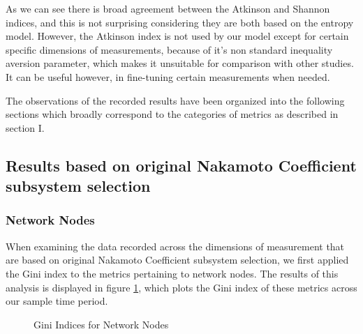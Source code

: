 \documentclass[conference]{IEEEtran}
\begin{document}
As we can see there is broad agreement between the Atkinson and Shannon indices, and this is not surprising considering they are both based on the entropy model.  However, the Atkinson index is not used by our model except for certain specific dimensions of measurements, because of it's non standard inequality aversion parameter, which makes it unsuitable for comparison with other studies. It can be useful however, in fine-tuning certain measurements when needed.

The observations of the recorded results have been organized into the following sections which broadly correspond to the categories of metrics as described in section I.

\subsection{Results based on original Nakamoto Coefficient subsystem selection}

\subsubsection{Network Nodes}
When examining the data recorded across the dimensions of measurement that are based on original Nakamoto Coefficient subsystem selection, we first applied the Gini index to the metrics pertaining to network nodes.  The results of this analysis is displayed in figure \ref{fig:gini index network nodes}, which plots the Gini index of these metrics across our sample time period.

\begin{figure}[ht]
\begin{center}
\end{center}
\caption{Gini Indices for Network Nodes}
\label{fig:gini index network nodes}
\end{figure}
\end{document}
